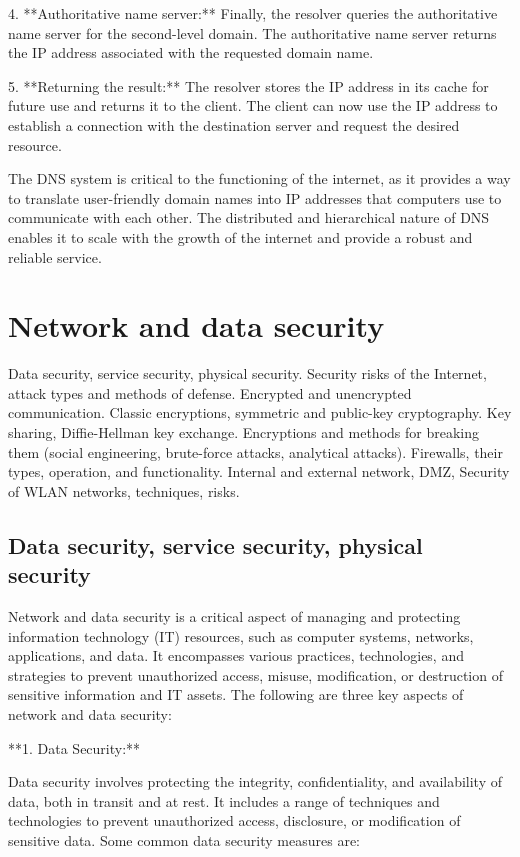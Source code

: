 \documentclass{article}
\begin{document}
4. **Authoritative name server:** Finally, the resolver queries the authoritative name server for the second-level domain. The authoritative name server returns the IP address associated with the requested domain name.

5. **Returning the result:** The resolver stores the IP address in its cache for future use and returns it to the client. The client can now use the IP address to establish a connection with the destination server and request the desired resource.

The DNS system is critical to the functioning of the internet, as it provides a way to translate user-friendly domain names into IP addresses that computers use to communicate with each other. The distributed and hierarchical nature of DNS enables it to scale with the growth of the internet and provide a robust and reliable service.


\section{Network and data security}

Data security, service security, physical security. Security risks of the Internet, attack types and methods of defense. Encrypted and unencrypted communication. Classic encryptions, symmetric and public-key cryptography. Key sharing, Diffie-Hellman key exchange. Encryptions and methods for breaking them (social engineering, brute-force attacks, analytical attacks). Firewalls, their types, operation, and functionality. Internal and external network, DMZ, Security of WLAN networks, techniques, risks.


\subsection{Data security, service security, physical security}

Network and data security is a critical aspect of managing and protecting information technology (IT) resources, such as computer systems, networks, applications, and data. It encompasses various practices, technologies, and strategies to prevent unauthorized access, misuse, modification, or destruction of sensitive information and IT assets. The following are three key aspects of network and data security:

**1. Data Security:**

Data security involves protecting the integrity, confidentiality, and availability of data, both in transit and at rest. It includes a range of techniques and technologies to prevent unauthorized access, disclosure, or modification of sensitive data. Some common data security measures are:
\end{document}
